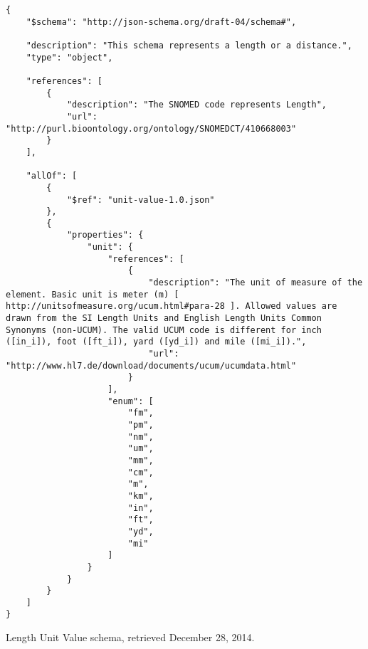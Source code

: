 \begin{listing}
\begin{verbatim}
{
    "$schema": "http://json-schema.org/draft-04/schema#",

    "description": "This schema represents a length or a distance.",
    "type": "object",

    "references": [
        {
            "description": "The SNOMED code represents Length",
            "url": "http://purl.bioontology.org/ontology/SNOMEDCT/410668003"
        }
    ],

    "allOf": [
        {
            "$ref": "unit-value-1.0.json"
        },
        {
            "properties": {
                "unit": {
                    "references": [
                        {
                            "description": "The unit of measure of the element. Basic unit is meter (m) [ http://unitsofmeasure.org/ucum.html#para-28 ]. Allowed values are drawn from the SI Length Units and English Length Units Common Synonyms (non-UCUM). The valid UCUM code is different for inch ([in_i]), foot ([ft_i]), yard ([yd_i]) and mile ([mi_i]).",
                            "url": "http://www.hl7.de/download/documents/ucum/ucumdata.html"
                        }
                    ],
                    "enum": [
                        "fm",
                        "pm",
                        "nm",
                        "um",
                        "mm",
                        "cm",
                        "m",
                        "km",
                        "in",
                        "ft",
                        "yd",
                        "mi"
                    ]
                }
            }
        }
    ]
}
\end{verbatim}
\caption{Length Unit Value schema, retrieved December 28, 2014.} 
\label{listing:length-unit-value-json}
\end{listing}
    
    

